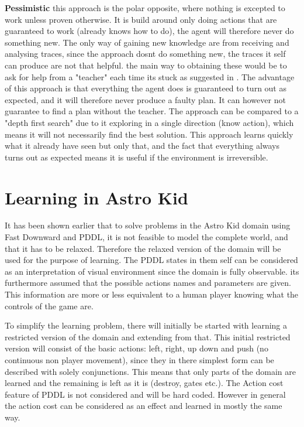 	\textbf{Pessimistic} this approach is the polar opposite, where nothing is excepted to work unless proven otherwise. It is build around only doing actions that are guaranteed to work (already knows how to do), the agent will therefore never do something new. The only way of gaining new knowledge are from receiving and analysing traces, since the approach dosnt do something new, the traces it self can produce are not that helpful. the main way to obtaining these would be to ask for help from a "teacher" each time its stuck as suggested in \cite{Action-Schemas}.
	The advantage of this approach is that everything the agent does is guaranteed to turn out as expected, and it will therefore never produce a faulty plan. It can however not guarantee to find a plan without the teacher. The approach can be compared to a "depth first search" due to it exploring in a single direction (know action), which means it will not necessarily find the best solution. 
	This approach learns quickly what it already have seen but only that, and the fact that everything always turns out as expected means it is useful if the environment is irreversible.
	
	

	
		
		
	
	\section{Learning in Astro Kid}
	It has been shown earlier that to solve problems in the Astro Kid domain using Fast Downward and PDDL, it is not feasible to model the complete world, and that it has to be relaxed. Therefore the relaxed version of the domain will be used for the purpose of learning. The PDDL states in them self can be considered as an interpretation of visual environment since the domain is fully observable. its furthermore assumed that the possible actions names and parameters are given. This information are more or less equivalent to a human player knowing what the controls of the game are. 
	
	
	To simplify the learning problem, there will initially be started with learning a restricted version of the domain and extending from that. This initial restricted version will consist of the basic actions: left, right, up down and push (no continuous non player movement), since they in there simplest form can be described with solely conjunctions. This means that only parts of the domain are learned and the remaining is left as it is (destroy, gates etc.). The Action cost feature of PDDL is not considered and will be hard coded. However in general the action cost can be considered as an effect and learned in mostly the same way.

